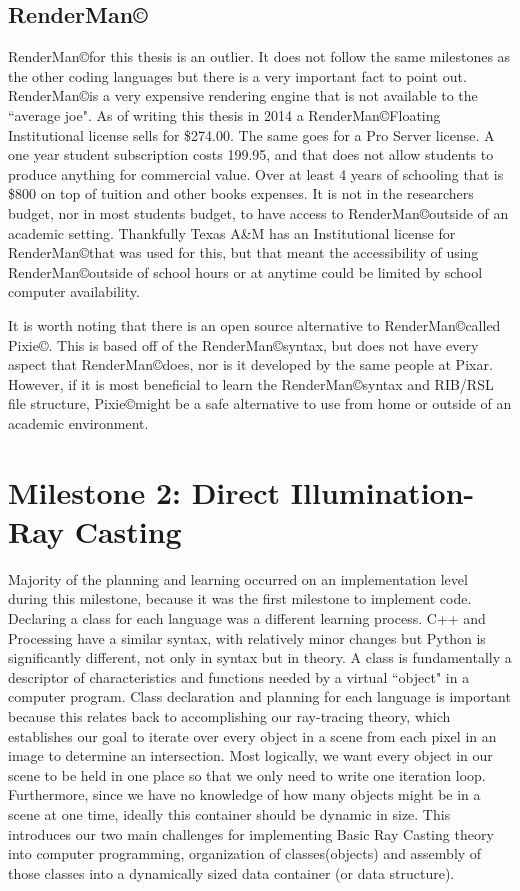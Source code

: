 \subsection{RenderMan\copyright}
RenderMan\copyright \space for this thesis is an outlier.  It does not follow the same milestones as the other coding languages but there is a very important fact to point out.  RenderMan\copyright\space is a very expensive rendering engine that is not available to the ``average joe".  As of writing this thesis in 2014 a RenderMan\copyright\space Floating Institutional license sells for \$274.00.  The same goes for a Pro Server license.  A one year student subscription costs 199.95, and that does not allow students to produce anything for commercial value.  Over at least 4 years of schooling that is \$800 on top of tuition and other books expenses.  It is not in the researchers budget, nor in most students budget, to have access to RenderMan\copyright\space outside of an academic setting.  Thankfully Texas A\&M has an Institutional license for RenderMan\copyright\space that was used for this, but that meant the accessibility of using RenderMan\copyright\space outside of school hours or at anytime could be limited by school computer availability.

It is worth noting that there is an open source alternative to RenderMan\copyright\space called Pixie\copyright.  This is based off of the RenderMan\copyright\space syntax, but does not have every aspect that RenderMan\copyright\space does, nor is it developed by the same people at Pixar.  However, if it is most beneficial to learn the RenderMan\copyright\space syntax and RIB/RSL file structure, Pixie\copyright\space might be a safe alternative to use from home or outside of an academic environment.

\section{Milestone 2: Direct Illumination- Ray Casting}
Majority of the planning and learning occurred on an implementation level during this milestone, because it was the first milestone to implement code.  Declaring a class for each language was a different learning process.  C++ and Processing have a similar syntax, with relatively minor changes but Python is significantly different, not only in syntax but in theory.
A class is fundamentally a descriptor of characteristics and functions needed by a virtual ``object" in a computer program.  Class declaration and planning for each language is important because this relates back to accomplishing our ray-tracing theory, which establishes our goal to iterate over every object in a scene from each pixel in an image to determine an intersection.  Most logically, we want every object in our scene to be held in one place so that we only need to write one iteration loop.  Furthermore, since we have no knowledge of how many objects might be in a scene at one time, ideally this container should be dynamic in size.  This introduces our two main challenges for implementing Basic Ray Casting theory into computer programming, organization of classes(objects) and assembly of those classes into a dynamically sized data container (or data structure).
